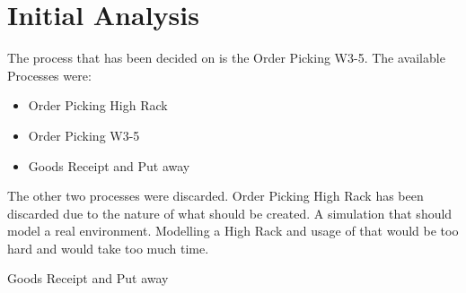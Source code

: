 \chapter{Initial Analysis}
The process that has been decided on is the Order Picking W3-5. The available Processes were:
\begin{itemize}
	\item Order Picking High Rack
	\item Order Picking W3-5
	\item Goods Receipt and Put away
\end{itemize}

The other two processes were discarded. Order Picking High Rack has been discarded due to the nature of what should be created. A simulation that should model a real environment. Modelling a High Rack and usage of that would be too hard and would take too much time. 

Goods Receipt and Put away